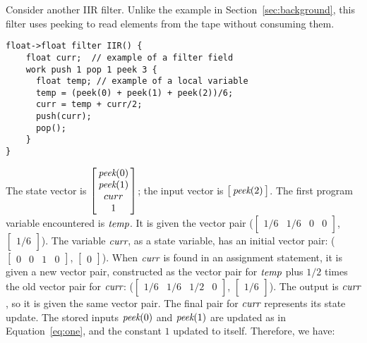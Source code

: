 \newpage {}
\enlargethispage{-1\baselineskip}

Consider another IIR filter.  Unlike the example in
Section~\ref{sec:background}, this filter uses peeking to read
elements from the tape without consuming them.
\begin{singlespace}
\small
\begin{verbatim}
float->float filter IIR() {
    float curr;  // example of a filter field
    work push 1 pop 1 peek 3 {
      float temp; // example of a local variable
      temp = (peek(0) + peek(1) + peek(2))/6;
      curr = temp + curr/2;
      push(curr);
      pop();
    }
}
\end{verbatim}
\end{singlespace}
\vspace{-16pt}

\noindent The state vector is $\left [\hspace{-3.2pt}\begin{array} {c} \mbox{\it peek}(0) \\ \mbox{\it peek}(1) \\ curr \\ 1 \end{array} \hspace{-3.2pt}\right]$; the input vector is $\left [\hspace{-3.2pt}\begin{array} {c} \mbox{\it peek}(2) \end{array} \hspace{-3.2pt}\right]$. The first program
variable encountered is $\mbox{\it temp}$. It is given the vector pair
($\left [\begin{array} {cccc} 1/6 & 1/6 & 0 & 0 \end{array} \right ]$, $\left [ \begin{array} {c} 1/6 \end{array} \right ]$). The
variable $\mbox{\it curr}$, as a state variable, has an initial vector pair:
($\left [\begin{array} {cccc} 0 & 0 & 1 & 0 \end{array} \right ]$, $\left [ \begin{array} {c} 0 \end{array} \right ]$). 
When $\mbox{\it curr}$ is found in an assignment
statement, it is given a new vector pair, constructed as the vector
pair for $\mbox{\it temp}$ plus $1/2$ times the old vector pair for $\mbox{\it curr}$:
($\left [ \begin{array} {cccc} 1/6 & 1/6 & 1/2 & 0 \end{array}
\right ]$, $\left [ \begin{array} {c} 1/6 \end{array} \right ]$). 
The output is $\mbox{\it curr}$, so it is given the same vector
pair. The final pair for $\mbox{\it curr}$ represents its state update. The
stored inputs $\mbox{\it peek}(0)$ and $\mbox{\it peek}(1)$ are updated as in
Equation~\ref{eq:one}, and the constant $1$ updated to itself. Therefore,
we have:

